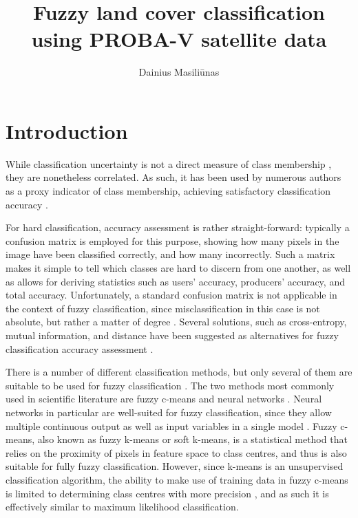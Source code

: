 \documentclass[a4paper,10pt]{article}
\title{Fuzzy land cover classification using PROBA-V satellite data}
\author{Dainius Masili\=unas}
\begin{document}
\maketitle

\begin{abstract}

\end{abstract}

\section{Introduction}

While classification uncertainty is not a direct measure of class membership \cite{sytze2000fuzzyset}, they are nonetheless correlated. As such, it has been used by numerous authors as a proxy indicator of class membership, achieving satisfactory classification accuracy \cite{foody2002accuracy}.

For hard classification, accuracy assessment is rather straight-forward: typically a confusion matrix is employed for this purpose, showing how many pixels in the image have been classified correctly, and how many incorrectly. Such a matrix makes it simple to tell which classes are hard to discern from one another, as well as allows for deriving statistics such as users' accuracy, producers' accuracy, and total accuracy. Unfortunately, a standard confusion matrix is not applicable in the context of fuzzy classification, since misclassification in this case is not absolute, but rather a matter of degree \cite{foody2002accuracy}. Several solutions, such as cross-entropy, mutual information, and distance have been suggested as alternatives for fuzzy classification accuracy assessment \cite{lu2007methods}.

There is a number of different classification methods, but only several of them are suitable to be used for fuzzy classification \cite{nath2014methods}. The two methods most commonly used in scientific literature are fuzzy c-means and neural networks \cite{zhang2001fullyfuzzy}. Neural networks in particular are well-suited for fuzzy classification, since they allow multiple continuous output as well as input variables in a single model \cite{foody1997fuzzynnet}. Fuzzy c-means, also known as fuzzy k-means or soft k-means, is a statistical method that relies on the proximity of pixels in feature space to class centres, and thus is also suitable for fully fuzzy classification. However, since k-means is an unsupervised classification algorithm, the ability to make use of training data in fuzzy c-means is limited to determining class centres with more precision \cite{hengl2004fuzzycmeans}, and as such it is effectively similar to maximum likelihood classification.
\end{document}
